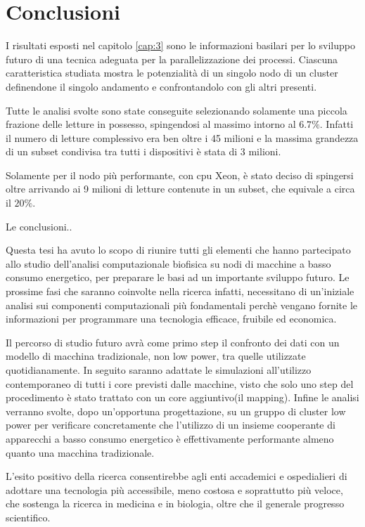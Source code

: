 \chapter{Conclusioni}
I risultati esposti nel capitolo \ref{cap:3} sono le informazioni basilari per lo sviluppo futuro di una tecnica adeguata per la parallelizzazione dei processi.
Ciascuna caratteristica studiata mostra le potenzialità di un singolo nodo di un cluster definendone il singolo andamento e confrontandolo con gli altri presenti.

Tutte le analisi svolte sono state conseguite selezionando solamente una piccola frazione delle letture in possesso, spingendosi al massimo intorno al $6.7\%$. 
Infatti il numero di letture complessivo era ben oltre i 45 milioni e la massima grandezza di un subset condivisa tra tutti i dispositivi è stata di 3 milioni.

Solamente per il nodo più performante, con cpu Xeon, è stato deciso di spingersi oltre arrivando ai 9 milioni di letture contenute in un subset, che equivale a circa il $20\%$. 

Le conclusioni..

Questa tesi ha avuto lo scopo di riunire tutti gli elementi che hanno partecipato allo studio dell'analisi computazionale biofisica su nodi di macchine a basso consumo energetico, per preparare le basi ad un importante sviluppo futuro.  
Le prossime fasi che saranno coinvolte nella ricerca infatti, necessitano di un'iniziale analisi sui componenti computazionali più fondamentali perchè vengano fornite le informazioni per programmare una tecnologia efficace, fruibile ed economica.

Il percorso di studio futuro avrà come primo step il confronto dei dati con un modello di macchina tradizionale, non low power, tra quelle utilizzate quotidianamente.
In seguito saranno adattate le simulazioni all'utilizzo contemporaneo di tutti i core previsti dalle macchine, visto che solo uno step del procedimento è stato trattato con un core aggiuntivo(il mapping).
Infine le analisi verranno svolte, dopo un'opportuna progettazione, su un gruppo di cluster low power per verificare concretamente che l'utilizzo di un insieme cooperante di apparecchi a basso consumo energetico è effettivamente performante almeno quanto una macchina tradizionale.

L'esito positivo della ricerca consentirebbe agli enti accademici e ospedialieri di adottare una tecnologia più accessibile, meno costosa e soprattutto più veloce, che sostenga la ricerca in medicina e in biologia, oltre che il generale progresso scientifico.


